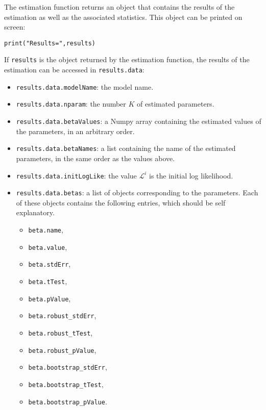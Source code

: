 \documentclass[12pt,a4paper]{article}
\begin{document}
The estimation function returns an object that contains the results of
the estimation as well as the associated statistics. This object can
be printed on screen:
\begin{lstlisting}[style=nonumbers]
print("Results=",results)
\end{lstlisting}

If \lstinline+results+ is the object returned by the estimation
function, the results of the estimation can be accessed in
\lstinline+results.data+:
\begin{itemize}
\item \lstinline+results.data.modelName+: the model name.
\item \lstinline+results.data.nparam+: the number $K$ of estimated parameters.
\item \lstinline+results.data.betaValues+: a Numpy array containing
  the estimated values of the parameters, in an arbitrary order.
\item \lstinline+results.data.betaNames+: a list containing the name
  of the estimated parameters, in the same order as the values above.
\item \lstinline+results.data.initLogLike+: the value $\mathcal{L}^i$
  is the initial log likelihood. 
\item \lstinline+results.data.betas+: a list of objects corresponding
  to the parameters. Each of these objects contains the following
  entries, which should be self explanatory. 
\begin{itemize}
\item \lstinline+beta.name+,
\item \lstinline+beta.value+,
\item \lstinline+beta.stdErr+,
\item \lstinline+beta.tTest+,
\item \lstinline+beta.pValue+,
\item \lstinline+beta.robust_stdErr+,
\item \lstinline+beta.robust_tTest+,
\item \lstinline+beta.robust_pValue+,
\item \lstinline+beta.bootstrap_stdErr+,
\item \lstinline+beta.bootstrap_tTest+,
\item \lstinline+beta.bootstrap_pValue+.
\end{itemize}
  

\end{itemize}
\end{document}
